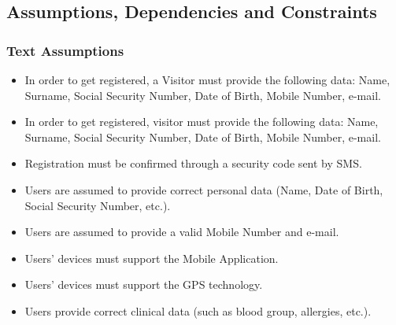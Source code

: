 \documentclass[12pt,a4paper]{article}
\begin{document}
	\subsection{Assumptions, Dependencies and Constraints}
		\subsubsection{Text Assumptions}
			\begin{itemize}
				\item In order to get registered, a Visitor must provide the following data: Name, Surname, Social Security Number, Date of Birth, Mobile Number, e-mail.
				\item In order to get registered, visitor must provide the following data: Name, Surname, Social Security Number, Date of Birth, Mobile Number, e-mail.
				\item Registration must be confirmed through a security code sent by SMS.
				\item Users are assumed to provide correct personal data (Name, Date of Birth, Social Security Number, etc.).
				\item Users are assumed to provide a valid Mobile Number and e-mail.
				\item Users' devices must support the Mobile Application.
				\item Users' devices must support the GPS technology.
				\item Users provide correct clinical data (such as blood group, allergies, etc.).
			\end{itemize}
\end{document}
